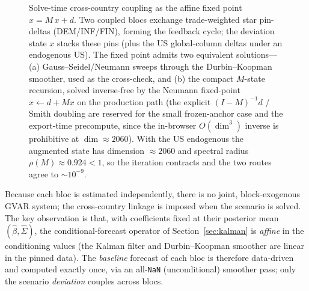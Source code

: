 \documentclass[11pt]{article}
\theoremstyle{definition}
\theoremstyle{remark}
\begin{document}
\begin{figure}[!ht]
  \caption{Solve-time cross-country coupling as the affine fixed point
    $x = M\,x + d$. Two coupled blocs exchange trade-weighted star pin-deltas
    (DEM/INF/FIN), forming the feedback cycle; the deviation state $x$ stacks
    these pins (plus the US global-column deltas under an endogenous US). The
    fixed point admits two equivalent solutions---(a) Gauss--Seidel/Neumann
    sweeps through the Durbin--Koopman smoother, used as the cross-check, and (b)
    the compact $M$-state recursion, solved inverse-free by the Neumann
    fixed-point $x\leftarrow d+Mx$ on the production path (the explicit
    $(I-M)^{-1}d$ / Smith doubling are reserved for the small frozen-anchor case
    and the export-time precompute, since the in-browser $O(\dim^{3})$ inverse is
    prohibitive at $\dim\approx 2060$). With the US endogenous the augmented
    state has dimension $\approx 2060$ and spectral radius
    $\rho(M)\approx 0.924<1$, so the iteration contracts and the two routes agree
    to $\sim 10^{-9}$.}
  \label{fig:coupling}
\end{figure}

Because each bloc is estimated independently, there is no joint, block-exogenous
GVAR system; the cross-country linkage is imposed when the scenario is solved.
The key observation is that, with coefficients fixed at their posterior mean
$(\hat\beta, \hat\Sigma)$, the conditional-forecast operator of
Section~\ref{sec:kalman} is \emph{affine} in the conditioning values (the
Kalman filter and Durbin--Koopman smoother are linear in the pinned data). The
\emph{baseline} forecast of each bloc is therefore data-driven and computed
exactly once, via an all-\texttt{NaN} (unconditional) smoother pass; only the
scenario \emph{deviation} couples across blocs.
\end{document}
